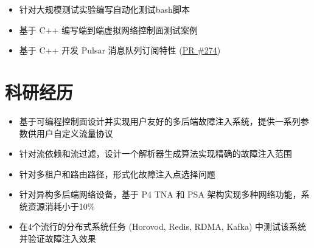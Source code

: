 \documentclass{resume}
\begin{document}

\begin{itemize}[parsep=0.5ex]
  \item 针对大规模测试实验编写自动化测试bash脚本
  \item 基于 C++ 编写端到端虚拟网络控制面测试案例
  \item 基于 C++ 开发 Pulsar 消息队列订阅特性 (\href{https://github.com/futurewei-cloud/alcor-control-agent/pull/274}{PR \#274})
\end{itemize}

\section{科研经历}

\begin{itemize}[parsep=0.5ex]
  \item 基于可编程控制面设计并实现用户友好的多后端故障注入系统，提供一系列参数供用户自定义流量协议
  \item 针对流依赖和流过滤，设计一个解析器生成算法实现精确的故障注入范围
  \item 针对多租户和路由路径，形式化故障注入点选择问题
  \item 针对异构多后端网络设备，基于 P4 TNA 和 PSA 架构实现多种网络功能，系统资源消耗小于10\%
  \item 在4个流行的分布式系统任务 (Horovod, Redis, RDMA, Kafka) 中测试该系统并验证故障注入效果
\end{itemize}
\end{document}
